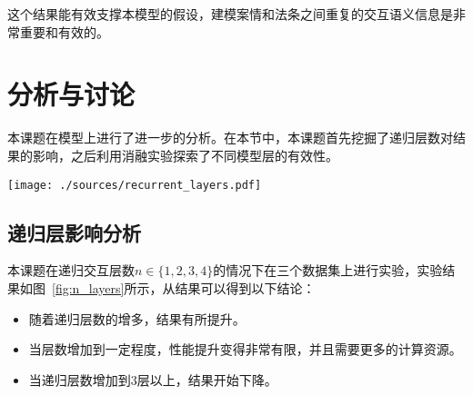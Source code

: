 这个结果能有效支撑本模型的假设，建模案情和法条之间重复的交互语义信息是非常重要和有效的。

\section{分析与讨论}
\label{sec:ran_analysis}
本课题在模型上进行了进一步的分析。在本节中，本课题首先挖掘了递归层数对结果的影响，之后利用消融实验探索了不同模型层的有效性。
\begin{figure*}[hbtp]
    \centering
    \texttt{[image: ./sources/recurrent\_layers.pdf]}
    \vspace{-10pt}
    \caption{\label{fig:n_layers} 递归层数影响实验图}
    \vspace{-5pt}
\end{figure*}

\subsection{递归层影响分析}
本课题在递归交互层数$n \in \{1,2,3,4\}$的情况下在三个数据集上进行实验，实验结果如图~\ref{fig:n_layers}所示，从结果可以得到以下结论：
\begin{itemize}
    \item 随着递归层数的增多，结果有所提升。
    \item 当层数增加到一定程度，性能提升变得非常有限，并且需要更多的计算资源。
    \item 当递归层数增加到3层以上，结果开始下降。
\end{itemize}



